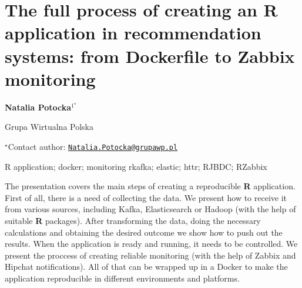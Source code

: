 \documentclass[\main/boa.tex]{subfiles}
\begin{document}
\section{The full process of creating an R application in recommendation systems:
from Dockerfile to Zabbix monitoring}

\begin{center}
  {\bf Natalia Potocka$^{1^\star}$}
\end{center}

\vskip 0.3cm

\begin{affiliations}
\begin{enumerate}
\begin{minipage}{0.915\textwidth}
\centering
\item Grupa Wirtualna Polska \\[-2pt]
\end{minipage}
\end{enumerate}
$^\star$Contact author: \href{mailto:Natalia.Potocka@grupawp.pl}{\nolinkurl{Natalia.Potocka@grupawp.pl}}\\
\end{affiliations}

\vskip 0.5cm

\begin{minipage}{0.915\textwidth}
\keywords R application; docker; monitoring
\packages rkafka; elastic; httr; RJBDC; RZabbix
\end{minipage}

\vskip 0.8cm

The presentation covers the main steps of creating a reproducible
\textbf{R} application. First of all, there is a need of collecting the
data. We present how to receive it from various sources, including
Kafka, Elasticsearch or Hadoop (with the help of suitable \textbf{R}
packages). After transforming the data, doing the necessary calculations
and obtaining the desired outcome we show how to push out the results.
When the application is ready and running, it needs to be controlled. We
present the proccess of creating reliable monitoring (with the help of
Zabbix and Hipchat notifications). All of that can be wrapped up in a
Docker to make the application reproducible in different environments
and platforms.
\end{document}
